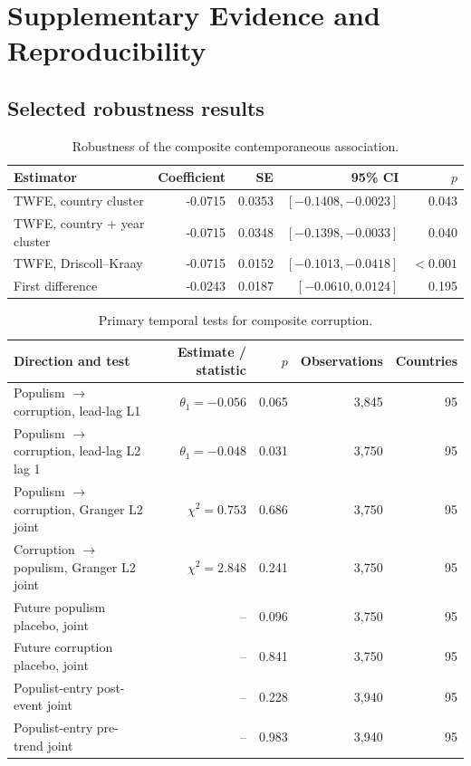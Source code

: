 \chapter{Supplementary Evidence and Reproducibility}

\section{Selected robustness results}
\label{app:robustness}

\begin{table}[H]
\centering
\caption{Robustness of the composite contemporaneous association.}
\label{tab:assocrobust}
\small
\begin{tabular}{lrrrr}
\toprule
Estimator & Coefficient & SE & 95\% CI & $p$ \\
\midrule
TWFE, country cluster & -0.0715 & 0.0353 & $[-0.1408,-0.0023]$ & 0.043 \\
TWFE, country + year cluster & -0.0715 & 0.0348 & $[-0.1398,-0.0033]$ & 0.040 \\
TWFE, Driscoll--Kraay & -0.0715 & 0.0152 & $[-0.1013,-0.0418]$ & $<0.001$ \\
First difference & -0.0243 & 0.0187 & $[-0.0610,0.0124]$ & 0.195 \\
\bottomrule
\end{tabular}
\end{table}

\begin{table}[H]
\centering
\caption{Primary temporal tests for composite corruption.}
\label{tab:directionappendix}
\small
\begin{tabularx}{\textwidth}{Yrrrr}
\toprule
Direction and test & Estimate / statistic & $p$ & Observations & Countries \\
\midrule
Populism $\rightarrow$ corruption, lead-lag L1 & $\theta_1=-0.056$ & 0.065 & 3,845 & 95 \\
Populism $\rightarrow$ corruption, lead-lag L2 lag 1 & $\theta_1=-0.048$ & 0.031 & 3,750 & 95 \\
Populism $\rightarrow$ corruption, Granger L2 joint & $\chi^2=0.753$ & 0.686 & 3,750 & 95 \\
Corruption $\rightarrow$ populism, Granger L2 joint & $\chi^2=2.848$ & 0.241 & 3,750 & 95 \\
Future populism placebo, joint & -- & 0.096 & 3,750 & 95 \\
Future corruption placebo, joint & -- & 0.841 & 3,750 & 95 \\
Populist-entry post-event joint & -- & 0.228 & 3,940 & 95 \\
Populist-entry pre-trend joint & -- & 0.983 & 3,940 & 95 \\
\bottomrule
\end{tabularx}
\end{table}

